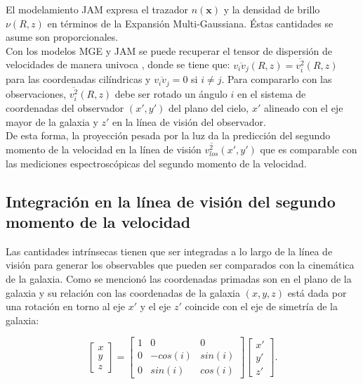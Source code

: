 El modelamiento JAM expresa el trazador $n(\textbf{x})$ y la densidad de brillo $\nu(R, z)$ en términos de la Expansión Multi-Gaussiana. Éstas cantidades se asume son proporcionales.\\

Con los modelos MGE y JAM se puede recuperar el tensor de dispersión de velocidades de manera univoca \cite{TR16}, donde se tiene que: $\overline{v_i v_j}(R,z) = \overline{v_i^2}(R, z)$ para las coordenadas cilíndricas y $\overline{v_i v_j} = 0$ si $i\neq j$. Para compararlo con las observaciones, $\overline{v_i^2}(R, z)$ debe ser rotado un ángulo $i$ en el sistema de coordenadas del observador $(x', y')$ del plano del cielo, $x'$ alineado con el eje mayor de la galaxia y $z'$ en la línea de visión del observador.\\

De esta forma, la proyección pesada por la luz da la predicción del segundo momento de la velocidad en la línea de visión $\overline{v_{los}^2}(x', y')$ que es comparable con las mediciones espectroscópicas del segundo momento de la velocidad.

\subsection{Integración en la línea de visión del segundo momento de la velocidad}

Las cantidades intrínsecas tienen que ser integradas a lo largo de la línea de visión para generar los observables que pueden ser comparados con la cinemática de la galaxia. Como se mencionó las coordenadas primadas son en el plano de la galaxia y su relación con las coordenadas de la galaxia $(x, y, z)$ está dada por una rotación en torno al eje $x'$ y el eje $z'$ coincide con el eje de simetría de la galaxia:

\[
\begin{bmatrix}
    x \\
    y \\
    z
\end{bmatrix}
=
\begin{bmatrix}
    1 & 0 & 0 \\
    0 & -cos(i) & sin(i) \\
    0 & sin(i) & cos(i)
\end{bmatrix}
\begin{bmatrix}
    x' \\
    y' \\
    z'
\end{bmatrix}.
\]

